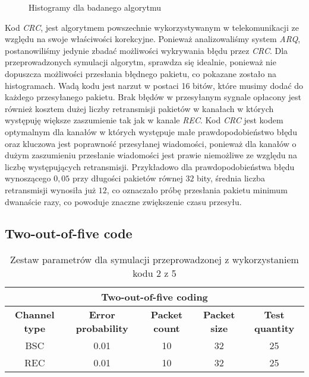 \documentclass{article}
\begin{document}
\newpage

\begin{figure}[h!]
\centering
{}
\qquad 
{}
\caption{Histogramy dla badanego algorytmu}
\end{figure}

Kod \textit{CRC}, jest algorytmem powszechnie wykorzystywanym w telekomunikacji ze względu na swoje właściwości korekcyjne. Ponieważ analizowaliśmy system \textit{ARQ}, postanowiliśmy jedynie zbadać możliwości wykrywania błędu przez \textit{CRC}. Dla przeprowadzonych symulacji algorytm, sprawdza się idealnie, ponieważ nie dopuszcza możliwości przesłania błędnego pakietu, co pokazane zostało na histogramach. Wadą kodu jest narzut w postaci 16 bitów, które musimy dodać do każdego przesyłanego pakietu. Brak błędów w przesyłanym sygnale opłacony jest również kosztem dużej liczby retransmisji pakietów w kanałach w których występuję większe zaszumienie tak jak w kanale \textit{REC}. Kod \textit{CRC} jest kodem optymalnym dla kanałów w których występuje małe prawdopodobieństwo błędu oraz kluczowa jest poprawność przesyłanej wiadomości, ponieważ dla kanałów o dużym zaszumieniu przesłanie wiadomości jest prawie niemożliwe ze względu na liczbę występujących retransmisji. Przykładowo dla prawdopodobieństwa błędu wynoszącego $0,05$ przy długości pakietów równej $32$ bity, średnia liczba retransmisji wynosiła już $12$, co oznaczało próbę przesłania pakietu minimum dwanaście razy, co powoduje znaczne zwiększenie czasu przesyłu.

\subsection{Two-out-of-five code}

\begin{table}[htbp!]
\begin{tabular}{|c|c|c|c|c|}
\hline
\multicolumn{5}{|c|}{\textbf{Two-out-of-five coding}}                                                                                  \\ \hline
\textbf{Channel type} & \textbf{Error probability} & \textbf{Packet count} & \textbf{Packet size} & \textbf{Test quantity} \\ \hline
BSC                   & 0.01                      & 10                    & 32                   & 25                     \\ \hline
REC                   & 0.01                       & 10                    & 32                   & 25                     \\ \hline
\end{tabular}
\caption{Zestaw parametrów dla symulacji przeprowadzonej z wykorzystaniem kodu 2 z 5}
\end{table}
\end{document}
